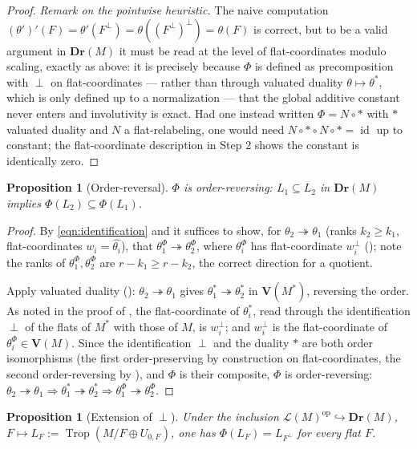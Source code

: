 \documentclass{article}
\newtheorem{proposition}[theorem]{Proposition}
\theoremstyle{definition}
\newcommand{\Trop}{\operatorname{Trop}}
\newcommand{\op}{\operatorname{op}}
\newcommand{\into}{\hookrightarrow}
\newcommand{\onto}{\twoheadrightarrow}
\newcommand{\Dr}{\mathbf{Dr}}
\newcommand{\bV}{\mathbf V}
\newcommand{\cLL}{\mathcal{L}}
\begin{document}
\begin{proof}
\smallskip
\noindent\emph{Remark on the pointwise heuristic.} The naive computation
$(\theta')'(F)=\theta'(F^{\perp})=\theta((F^{\perp})^{\perp})=\theta(F)$ is correct, but to be a
valid argument in $\Dr(M)$ it must be read at the level of flat-coordinates modulo scaling, exactly
as above: it is precisely because $\Phi$ is defined as precomposition with $\perp$ on
flat-coordinates --- rather than through valuated duality $\theta\mapsto\theta^{*}$, which is only
defined up to a normalization --- that the global additive constant never enters and involutivity is
exact. Had one instead written $\Phi=N\circ{*}$ with $*$ valuated duality and $N$ a flat-relabeling,
one would need $N\circ{*}\circ N\circ{*}=\operatorname{id}$ up to constant; the flat-coordinate
description in Step 2 shows the constant is identically zero.
\end{proof}

\begin{proposition}[Order-reversal]\label{prop:rev}
$\Phi$ is order-reversing: $L_1\subseteq L_2$ in $\Dr(M)$ implies $\Phi(L_2)\subseteq\Phi(L_1)$.
\end{proposition}

\begin{proof}
By \eqref{eqn:identification} and  it suffices to show, for $\theta_2\onto
\theta_1$ (ranks $k_2\ge k_1$, flat-coordinates $w_i=\widehat{\theta_i}$), that
$\theta_1^{\Phi}\onto\theta_2^{\Phi}$, where $\theta_i^{\Phi}$ has flat-coordinate $w_i^{\perp}$
(); note the ranks of $\theta_1^{\Phi},\theta_2^{\Phi}$ are $r-k_1\ge r-k_2$, the
correct direction for a quotient.

Apply valuated duality (): $\theta_2\onto\theta_1$ gives
$\theta_1^{*}\onto\theta_2^{*}$ in $\bV(M^{*})$, reversing the order. As noted in the proof of
, the flat-coordinate of $\theta_i^{*}$, read through the identification $\perp$ of the
flats of $M^{*}$ with those of $M$, is $w_i^{\perp}$; and $w_i^{\perp}$ is the flat-coordinate of
$\theta_i^{\Phi}\in\bV(M)$. Since the identification $\perp$ and the duality $*$ are both order
isomorphisms (the first order-preserving by construction on flat-coordinates, the second
order-reversing by ), and $\Phi$ is their composite, $\Phi$ is order-reversing:
$\theta_2\onto\theta_1\Rightarrow\theta_1^{*}\onto\theta_2^{*}\Rightarrow\theta_1^{\Phi}\onto
\theta_2^{\Phi}$.
\end{proof}

\begin{proposition}[Extension of $\perp$]\label{prop:ext}
Under the inclusion $\cLL(M)^{\op}\into\Dr(M)$, $F\mapsto L_F:=\Trop(M/F\oplus U_{0,F})$, one has
$\Phi(L_F)=L_{F^{\perp}}$ for every flat $F$.
\end{proposition}
\end{document}
